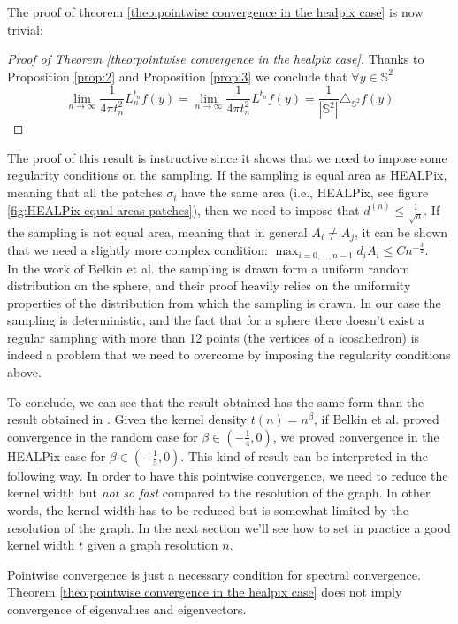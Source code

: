 The proof of theorem \ref{theo:pointwise convergence in the healpix case} is now trivial:
\begin{proof}[Proof of Theorem \ref{theo:pointwise convergence in the healpix case}]
	Thanks to Proposition \ref{prop:2} and Proposition \ref{prop:3}	we conclude that $\forall y\in\mathbb S^2 $
	$$\lim_{n\to\infty}\frac{1}{4\pi t_n^2} L_n^{t_n}f(y) =  \lim_{n\to\infty}\frac{1}{4\pi t_n^2} L^{t_n}f(y) = \frac{1}{|\mathbb S^2|}\triangle_{\mathbb S^2}f(y) $$
\end{proof}

The proof of this result is instructive since it shows that we need to impose some regularity conditions on the sampling. If the sampling is equal area as HEALPix, meaning that all the patches $\sigma_i$ have the same area (i.e., HEALPix, see figure \ref{fig:HEALPix equal areas patches}), then we need to impose that $ d^{(n)}\leq \frac{1}{\sqrt{n}}$. If the sampling is not equal area, meaning that in general $A_i\neq A_j$, it can be shown that we need a slightly more complex condition: $\max_{i=0,...,n-1}d_iA_i\leq Cn^{-\frac{3}{2}}$.\\
In the work of Belkin et al. \cite{Belkin:2005:TTF:2138147.2138189} the sampling is drawn form a uniform random distribution on the sphere, and their proof heavily relies on the uniformity properties of the distribution from which the sampling is drawn. In our case the sampling is deterministic, and the fact that for a sphere there doesn't exist a regular sampling with more than 12 points (the vertices of a icosahedron) is indeed a problem that we need to overcome by imposing the regularity conditions above. 


To conclude, we can see that the result obtained has the same form than the result obtained in \cite{Belkin:2005:TTF:2138147.2138189}. Given the kernel density $t(n)=n^\beta$, if Belkin et al. proved convergence in the random case for $\beta \in (-\frac{1}{4}, 0)$, we proved convergence in the HEALPix case for $\beta \in (-\frac{1}{5}, 0)$. This kind of result can be interpreted in the following way. In order to have this pointwise convergence, we need to reduce the kernel width but \textit{not so fast} compared to the resolution of the graph. In other words, the kernel width has to be reduced but is somewhat limited by the resolution of the graph. In the next section we'll see how to set in practice a good kernel width $t$ given a graph resolution $n$.
\begin{remark}
	Pointwise convergence is just a necessary condition for spectral convergence.  Theorem \ref{theo:pointwise convergence in the healpix case} does not imply convergence of eigenvalues and eigenvectors.
\end{remark}

